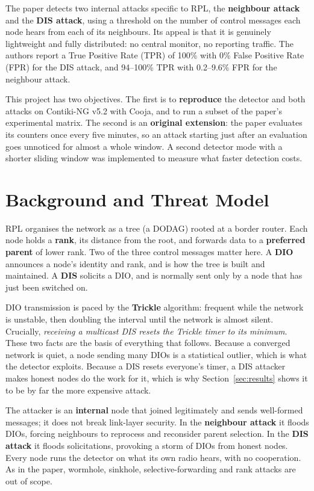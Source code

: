 \documentclass[11pt, a4paper]{article}
\begin{document}
The paper detects two internal attacks specific to RPL, the \textbf{neighbour attack} and the \textbf{DIS attack}, using a threshold on the number of control messages each node hears from each of its neighbours. Its appeal is that it is genuinely lightweight and fully distributed: no central monitor, no reporting traffic. The authors report a True Positive Rate (TPR) of 100\% with 0\% False Positive Rate (FPR) for the DIS attack, and 94--100\% TPR with 0.2--9.6\% FPR for the neighbour attack.

This project has two objectives. The first is to \textbf{reproduce} the detector and both attacks on Contiki-NG v5.2 with Cooja, and to run a subset of the paper's experimental matrix. The second is an \textbf{original extension}: the paper evaluates its counters once every five minutes, so an attack starting just after an evaluation goes unnoticed for almost a whole window. A second detector mode with a shorter sliding window was implemented to measure what faster detection costs.

\section{Background and Threat Model}

RPL organises the network as a tree (a DODAG) rooted at a border router. Each node holds a \textbf{rank}, its distance from the root, and forwards data to a \textbf{preferred parent} of lower rank. Two of the three control messages matter here. A \textbf{DIO} announces a node's identity and rank, and is how the tree is built and maintained. A \textbf{DIS} solicits a DIO, and is normally sent only by a node that has just been switched on.

DIO transmission is paced by the \textbf{Trickle} algorithm: frequent while the network is unstable, then doubling the interval until the network is almost silent. Crucially, \textit{receiving a multicast DIS resets the Trickle timer to its minimum}. These two facts are the basis of everything that follows. Because a converged network is quiet, a node sending many DIOs is a statistical outlier, which is what the detector exploits. Because a DIS resets everyone's timer, a DIS attacker makes honest nodes do the work for it, which is why Section~\ref{sec:results} shows it to be by far the more expensive attack.

The attacker is an \textbf{internal} node that joined legitimately and sends well-formed messages; it does not break link-layer security. In the \textbf{neighbour attack} it floods DIOs, forcing neighbours to reprocess and reconsider parent selection. In the \textbf{DIS attack} it floods solicitations, provoking a storm of DIOs from honest nodes. Every node runs the detector on what its own radio hears, with no cooperation. As in the paper, wormhole, sinkhole, selective-forwarding and rank attacks are out of scope.
\end{document}
